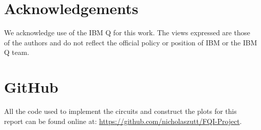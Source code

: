 \section*{Acknowledgements}
We acknowledge use of the IBM Q for this work. The views expressed are those of the authors and do not reflect the official policy or position of IBM or the IBM Q team.

\section*{GitHub}
All the code used to implement the circuits and construct the plots for this
report can be found online at:
\href{https://github.com/nicholaszutt/FQI-Project}{https://github.com/nicholaszutt/FQI-Project}.

